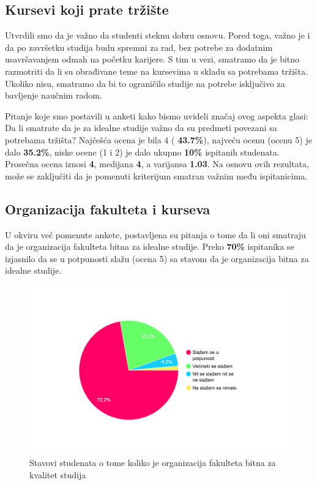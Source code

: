 \documentclass[a4paper]{article}
\begin{document}
{\subsection{Kursevi koji prate tržište}
\label{subsec:tržište_stavovi}
Utvrdili smo da je važno da studenti steknu dobru osnovu. Pored toga, važno je i da po završetku studija budu spremni za rad, bez potrebe za dodatnim usavršavanjem odmah na početku karijere.
S tim u vezi, smatramo da je bitno razmotriti da li su obrađivane teme na kursevima u skladu sa potrebama tržišta. Ukoliko nisu, smatramo da bi to ograničilo studije na potrebe isključivo za bavljenje naučnim radom.

 Pitanje koje smo postavili u anketi kako bismo uvideli značaj ovog aspekta glasi: Da li smatrate da je za idealne studije važno da su predmeti povezani sa potrebama tržišta? Najčešća ocena je bila 4 ( \textbf{43.7\%}), najveću ocenu (ocenu 5) je dalo \textbf{35.2\%}, niske ocene (1 i 2) je dalo ukupno \textbf{10\%} ispitanih studenata. Prosečna ocena iznosi \textbf{4}, medijana \textbf{4}, a varijansa \textbf{1.03}. Na osnovu ovih rezultata, može se zaključiti da je pomenuti kriterijum smatran važnim među ispitanicima.


\subsection{Organizacija fakulteta i kurseva}
\label{subsec:organizacija_stavovi}

U okviru već pomenute ankete, postavljena su pitanja o tome da li oni smatraju da je organizacija fakulteta bitna za idealne studije. Preko \textbf{70\%} ispitanika se izjasnilo da se u potpunosti slažu (ocena 5) sa stavom da je organizacija bitna za idealne studije.
\begin{figure}[h!]
\begin{center}
    \includegraphics[width=0.7\linewidth]{Slike/PieChartOrganizacijaFakulteta.png}
    \caption{Stavovi studenata o tome koliko je organizacija fakulteta bitna za kvalitet studija}
    \label{fig:organizacija}
\end{center}
\end{figure}

}
\end{document}
